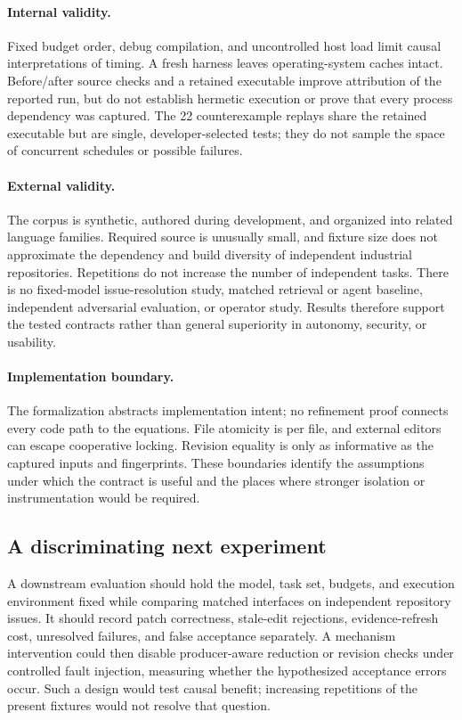 \paragraph{Internal validity.}
Fixed budget order, debug compilation, and uncontrolled host load limit causal interpretations of timing. A fresh harness leaves operating-system caches intact. Before/after source checks and a retained executable improve attribution of the reported run, but do not establish hermetic execution or prove that every process dependency was captured. The 22 counterexample replays share the retained executable but are single, developer-selected tests; they do not sample the space of concurrent schedules or possible failures.

\paragraph{External validity.}
The corpus is synthetic, authored during development, and organized into related language families. Required source is unusually small, and fixture size does not approximate the dependency and build diversity of independent industrial repositories. Repetitions do not increase the number of independent tasks. There is no fixed-model issue-resolution study, matched retrieval or agent baseline, independent adversarial evaluation, or operator study. Results therefore support the tested contracts rather than general superiority in autonomy, security, or usability.

\paragraph{Implementation boundary.}
The formalization abstracts implementation intent; no refinement proof connects every code path to the equations. File atomicity is per file, and external editors can escape cooperative locking. Revision equality is only as informative as the captured inputs and fingerprints. These boundaries identify the assumptions under which the contract is useful and the places where stronger isolation or instrumentation would be required.

\subsection{A discriminating next experiment}
A downstream evaluation should hold the model, task set, budgets, and execution environment fixed while comparing matched interfaces on independent repository issues. It should record patch correctness, stale-edit rejections, evidence-refresh cost, unresolved failures, and false acceptance separately. A mechanism intervention could then disable producer-aware reduction or revision checks under controlled fault injection, measuring whether the hypothesized acceptance errors occur. Such a design would test causal benefit; increasing repetitions of the present fixtures would not resolve that question.
